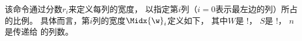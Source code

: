 % 
% 

该命令通过分数$r_i$来定义每列的宽度，
以指定第$i$列（$i=0$表示最左边的列）所占的比例。
具体而言，第$i$列的宽度$\Midx{\w}_i$定义如下，
其中$W$是 \!\textwidth!，
$S$是 \!\columnsep!，
$n$是传递给 \beginparacol 的列数。

% 

